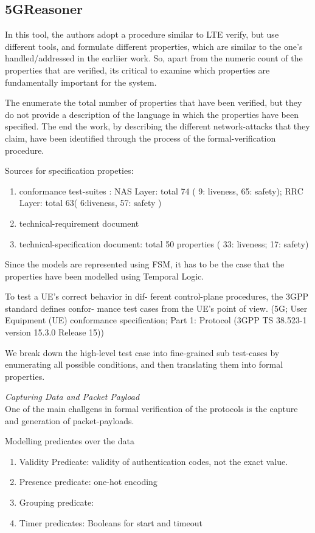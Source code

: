 \documentclass[acmsmall,review,authorversion]{acmart}
\begin{document}
\subsection{5GReasoner}
In this tool, the authors adopt a procedure similar to LTE verify, but use different tools, and formulate different properties, which are similar to the one's handled/addressed in the earliier work. So, apart from the numeric count of the properties that are verified, its critical to examine which properties are fundamentally important for the system. 

The enumerate the total number of properties that have been verified, but they do not provide a description of the language in which the properties have been specified. 
The end the work, by describing the different network-attacks that they claim, have been identified through the process of the formal-verification procedure. 

Sources for specification propeties:
\begin{enumerate}
\item conformance test-suites : NAS Layer: total 74 ( 9: liveness, 65: safety); RRC Layer: total 63( 6:liveness, 57: safety )
\item technical-requirement document 
\item technical-specification document:  total 50 properties ( 33: liveness; 17: safety) 
\end{enumerate}

Since the models are represented using FSM, it has to be the case that the properties have been modelled using Temporal Logic. 

To test a UE’s correct behavior in dif-
ferent control-plane procedures, the 3GPP standard defines confor-
mance test cases from the UE’s point of view. (5G; User Equipment (UE) conformance specification; Part 1: Protocol (3GPP
TS 38.523-1 version 15.3.0 Release 15)) 

We break down the high-level test case into fine-grained sub test-cases by enumerating all possible conditions, and then translating them into formal properties.

\textit{Capturing Data and Packet Payload}\\
One of the main challgens in formal verification of the protocols is the capture and generation of packet-payloads. 

Modelling predicates over the data
\begin{enumerate}
\item Validity Predicate: validity of authentication codes, not the exact value. 
\item Presence predicate: one-hot encoding
\item Grouping predicate: 
\item Timer predicates: Booleans for start and timeout 
\end{enumerate}
\end{document}
